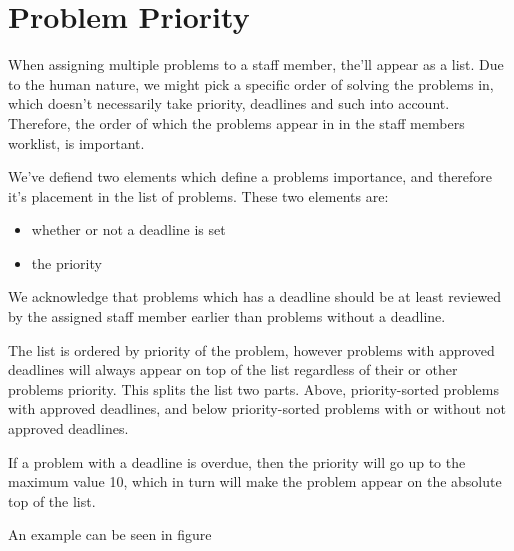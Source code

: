 \section{Problem Priority}
\label{sec:problem_priority}

When assigning multiple problems to a staff member, the'll appear as a list. Due to the human nature, we might pick a specific order of solving the problems in, which doesn't necessarily take priority, deadlines and such into account. Therefore, the order of which the problems appear in in the staff members worklist, is important.

We've defiend two elements which define a problems importance, and therefore it's placement in the list of problems. These two elements are:

\begin{itemize}
	\item whether or not a deadline is set
	\item the priority
\end{itemize}

We acknowledge that problems which has a deadline should be at least reviewed by the assigned staff member earlier than problems without a deadline.

The list is ordered by priority of the problem, however problems with approved deadlines will always appear on top of the list regardless of their or other problems priority. This splits the list two parts. Above, priority-sorted problems with approved deadlines, and below priority-sorted problems with or without not approved deadlines. 

If a problem with a deadline is overdue, then the priority will go up to the maximum value 10, which in turn will make the problem appear on the absolute top of the list.

An example can be seen in figure  